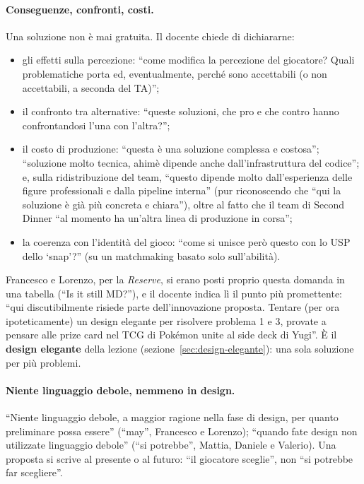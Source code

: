 \paragraph{Conseguenze, confronti, costi.} Una soluzione non è mai gratuita.
Il docente chiede di dichiararne:
\begin{itemize}
  \item gli effetti sulla percezione: ``come modifica la percezione del
        giocatore? Quali problematiche porta ed, eventualmente, perché sono
        accettabili (o non accettabili, a seconda del TA)'';
  \item il confronto tra alternative: ``queste soluzioni, che pro e che
        contro hanno confrontandosi l'una con l'altra?'';
  \item il costo di produzione: ``questa è una soluzione complessa e
        costosa''; ``soluzione molto tecnica, ahimè dipende anche
        dall'infrastruttura del codice''; e, sulla ridistribuzione del team,
        ``questo dipende molto dall'esperienza delle figure professionali e
        dalla pipeline interna'' (pur riconoscendo che ``qui la soluzione è
        già più concreta e chiara''), oltre al fatto che il team di Second
        Dinner ``al momento ha un'altra linea di produzione in corsa'';
  \item la coerenza con l'identità del gioco: ``come si unisce però questo
        con lo USP dello `snap'?'' (su un matchmaking basato solo sull'abilità).
\end{itemize}
Francesco e Lorenzo, per la \emph{Reserve}, si erano posti proprio questa
domanda in una tabella (``Is it still MD?''), e il docente indica lì il punto
più promettente: ``qui discutibilmente risiede parte dell'innovazione
proposta. Tentare (per ora ipoteticamente) un design elegante per risolvere
problema 1 e 3, provate a pensare alle prize card nel TCG di Pokémon unite al
side deck di Yugi''. È il \textbf{design elegante} della lezione
(sezione~\ref{sec:design-elegante}): una sola soluzione per più problemi.

\paragraph{Niente linguaggio debole, nemmeno in design.} ``Niente linguaggio
debole, a maggior ragione nella fase di design, per quanto preliminare possa
essere'' (``may'', Francesco e Lorenzo); ``quando fate design non utilizzate
linguaggio debole'' (``si potrebbe'', Mattia, Daniele e Valerio). Una
proposta si scrive al presente o al futuro: ``il giocatore sceglie'', non
``si potrebbe far scegliere''.

